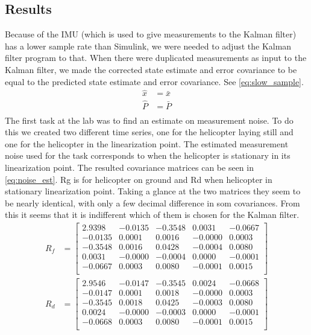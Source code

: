 \subsection{Results}
Because of the IMU (which is used to give measurements to the Kalman filter) has a lower 
sample rate than Simulink, we were needed to adjust the Kalman filter program to that. 
When there were duplicated measurements as input to the Kalman filter, we made the corrected
state estimate and error covariance to be equal to the predicted state estimate and error covariance. See \ref{eq:slow_sample}.
\begin{subequations}\label{eq:slow_sample}
    \begin{align}
    \hat{x} &= \bar{x}  \label{eq:bad_sample_x} \\
    \hat{P} &= \bar{P} \label{eq:bad_sample_p} \\
    \end{align}
\end{subequations}
The first task at the lab was to find an estimate on measurement noise. To do this we 
created two different time series, one for the helicopter laying still and one for the helicopter in the linearization point.
The estimated measurement noise used for the task corresponds to when the helicopter is stationary in its linearization point.
The resulted covariance matrices can be seen in \ref{eq:noise_est}. Rg is for helicopter on ground and Rd when helicopter in stationary linearization point.
Taking a glance at the two matrices they seem to be nearly identical, with only a few decimal difference in som covariances. 
From this it seems that it is indifferent which of them is chosen for the Kalman filter.
\begin{subequations}\label{eq:noise_est}
    \begin{align}
    R_f &=  \begin{bmatrix}
    2.9398 & -0.0135 & -0.3548 & 0.0031 & -0.0667\\
    -0.0135 &   0.0001  &  0.0016  & -0.0000  &  0.0003\\
   -0.3548  &  0.0016  &  0.0428  & -0.0004  &  0.0080\\
    0.0031  & -0.0000 &  -0.0004 &   0.0000  & -0.0001\\
   -0.0667  &  0.0003  &  0.0080 &  -0.0001  &  0.0015\\
    \end{bmatrix}\label{eq:Rg}\\
    R_d &= \begin{bmatrix}
        2.9546  & -0.0147  & -0.3545  &  0.0024   &-0.0668\\
        -0.0147 &   0.0001 &   0.0018 &  -0.0000  &  0.0003\\
        -0.3545 &   0.0018  &  0.0425 &  -0.0003  &  0.0080\\
         0.0024 &  -0.0000  & -0.0003 &   0.0000  & -0.0001\\
        -0.0668 &   0.0003  &  0.0080 &  -0.0001  &  0.0015\\
    \end{bmatrix}\label{eq:Rd}
    \end{align}
\end{subequations}

